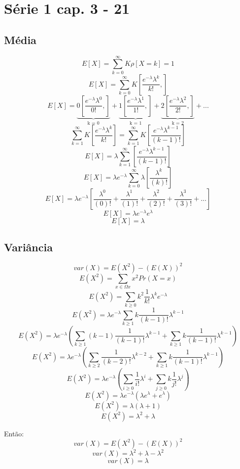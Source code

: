 \section*{Série 1 cap. 3 - 21}
\subsection*{Média}
$$E[X]=\sum_{k=0}^{\infty} K \rho [X = k] = 1$$
$$E[X]=\sum_{k=0}^{\infty} K [\frac{e^{-\lambda} \lambda^k}{k!},]$$
$$E[X]= \underbrace{0 [\frac{e^{-\lambda} \lambda^0}{0!},]}_\textrm{k = 0} + \underbrace{1 [\frac{e^{-\lambda} \lambda^1}{1!},]}_\textrm{k = 1} + \underbrace{2 [\frac{e^{-\lambda} \lambda^2}{2!},]}_\textrm{k = 2} + ...$$
$$\sum_{k=1}^{\infty} K [\frac{e^{-\lambda} \lambda^k}{k!}] = \sum_{k=1}^{\infty} K [\frac{e^{-\lambda} \lambda^{k-1}}{(k-1)!}]$$
$$E[X]=\lambda \sum_{k=1}^{\infty}[\frac{e^{-\lambda} \lambda^{k-1}}{(k-1)!}]$$
$$E[X]=\lambda e^{-\lambda} \sum_{k=0}^{\infty}\lambda[\frac{ \lambda^{k}}{(k)!}]$$
$$E[X]=\lambda e^{-\lambda} [\frac{ \lambda^{0}}{(0)!} + \frac{ \lambda^{1}}{(1)!} + \frac{ \lambda^{2}}{(2)!} + \frac{ \lambda^{3}}{(3)!} + ...]$$
$$E[X] = \lambda e^{-\lambda} e^{\lambda}$$
$$E[X] = \lambda$$

\subsection*{Variância}
$$var(X) = E(X^2)-(E(X))^2$$
$$E(X^2) = \sum_{x \in \Omega x}x^2 Pr(X = x)$$
$$E(X^2) = \sum_{k \geq 0}k^2 \frac{1}{k!} \lambda^k e^{-\lambda}$$
$$E(X^2) = \lambda e^{-\lambda} \sum_{k \geq 1}k \frac{1}{(k -1)!} \lambda^{k-1}$$
$$E(X^2) = \lambda e^{-\lambda} (\sum_{k \geq 1}(k-1) \frac{1}{(k -1)!} \lambda^{k-1} + \sum_{k \geq 1}k \frac{1}{(k -1)!} \lambda^{k-1})$$
$$E(X^2) = \lambda e^{-\lambda} (\sum_{k \geq 2} \frac{1}{(k -2)!} \lambda^{k-2} + \sum_{k \geq 1}k \frac{1}{(k -1)!} \lambda^{k-1})$$
$$E(X^2) = \lambda e^{-\lambda} (\sum_{i \geq 0} \frac{1}{i!} \lambda^i + \sum_{j \geq 0}k \frac{1}{j!} \lambda^j)$$
$$E(X^2) = \lambda e^{-\lambda} (\lambda e^{\lambda} + e^{\lambda})$$
$$E(X^2) = \lambda(\lambda + 1)$$
$$E(X^2) = \lambda^2 + \lambda$$

Então:
$$var(X) = E(X^2) - (E(X))^2$$
$$var(X) = \lambda^2 + \lambda - \lambda^2$$
$$var(X) = \lambda$$
